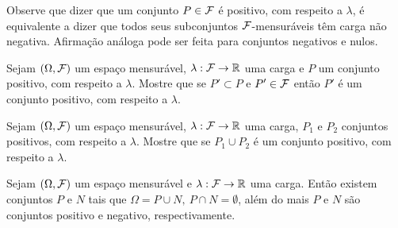 Observe que dizer que um conjunto $P\in \mathcal{F}$ é positivo,
com respeito a $\lambda$, é  equivalente a dizer que 
todos seus subconjuntos $\mathcal{F}$-mensuráveis têm carga
não negativa. Afirmação análoga pode ser feita para 
conjuntos negativos e nulos.

\begin{exercicio}
	Sejam $(\Omega,\mathcal{F})$ um espaço mensurável, $\lambda:\mathcal{F}\to\mathbb{R}$
	uma carga e $P$ um conjunto positivo, com respeito a $\lambda$. 
	Mostre que se $P'\subset P$ e $P'\in \mathcal{F}$ então $P'$ é um 
	conjunto positivo, com respeito a $\lambda$.
\end{exercicio}



\begin{exercicio}
	Sejam $(\Omega,\mathcal{F})$ um espaço mensurável, $\lambda:\mathcal{F}\to\mathbb{R}$
	uma carga, $P_1$ e $P_2$ conjuntos positivos, 
	com respeito a $\lambda$. 
	Mostre que se $P_1\cup P_2$  é um 
	conjunto positivo, com respeito a $\lambda$.
\end{exercicio}




\begin{teorema}
\label{teo-dec-Hahn}
Sejam $(\Omega,\mathcal{F})$ um espaço mensurável e $\lambda:\mathcal{F}\to\mathbb{R}$
uma carga. Então existem conjuntos $P$ e $N$ tais que 
$\Omega = P\cup N,\  P\cap N=\emptyset$, além do mais 
$P$ e $N$ são conjuntos positivo e negativo, respectivamente.
\end{teorema}
